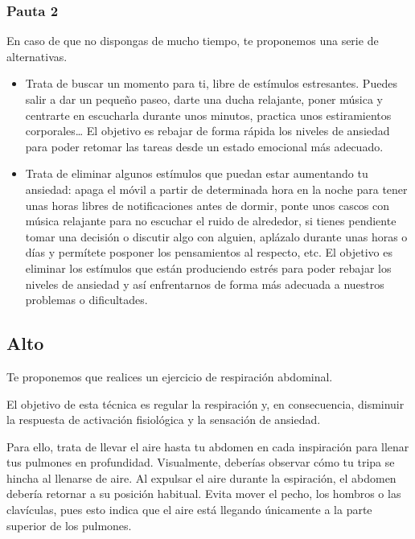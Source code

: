             \subsubsection{Pauta 2}
                En caso de que no dispongas de mucho tiempo, te proponemos una serie de alternativas. 

                \begin{itemize}
                    \item Trata de buscar un momento para ti, libre de estímulos estresantes. Puedes salir a dar un pequeño paseo, darte una ducha relajante, poner música y centrarte en escucharla durante unos minutos, practica unos estiramientos corporales… El objetivo es rebajar de forma rápida los niveles de ansiedad para poder retomar las tareas desde un estado emocional más adecuado. 
                    \item Trata de eliminar algunos estímulos que puedan estar aumentando tu ansiedad: apaga el móvil a partir de determinada hora en la noche para tener unas horas libres de notificaciones antes de dormir, ponte unos cascos con música relajante para no escuchar el ruido de alrededor, si tienes pendiente tomar una decisión o discutir algo con alguien, aplázalo durante unas horas o días y permítete posponer los pensamientos al respecto, etc. El objetivo es eliminar los estímulos que están produciendo estrés para poder rebajar los niveles de ansiedad y así enfrentarnos de forma más adecuada a nuestros problemas o dificultades. 
                \end{itemize}
        \subsection{Alto}
            Te proponemos que realices un ejercicio de respiración abdominal. 

            El objetivo de esta técnica es regular la respiración y, en consecuencia, disminuir la respuesta de activación fisiológica y la sensación de ansiedad. 
            
            Para ello, trata de llevar el aire hasta tu abdomen en cada inspiración para llenar tus pulmones en profundidad. Visualmente, deberías observar cómo tu tripa se hincha al llenarse de aire. Al expulsar el aire durante la espiración, el abdomen debería retornar a su posición habitual. Evita mover el pecho, los hombros o las clavículas, pues esto indica que el aire está llegando únicamente a la parte superior de los pulmones.
            
